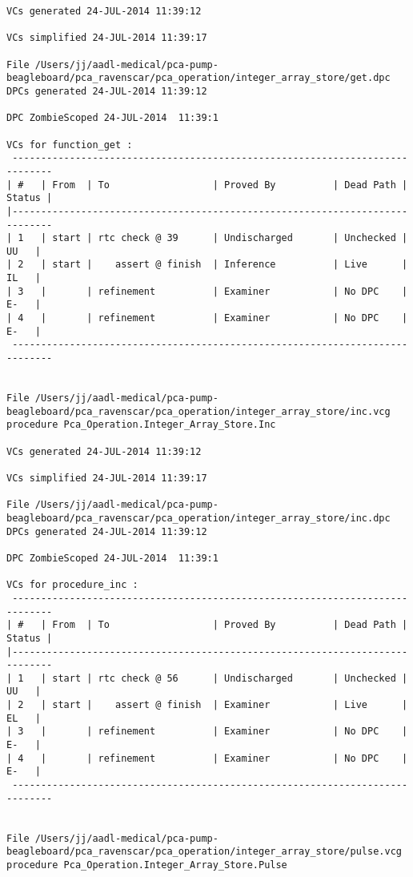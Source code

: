 \begin{lstlisting}[frame=single, gobble=0, caption={POGS report for PCA Pump prototype}]
VCs generated 24-JUL-2014 11:39:12

VCs simplified 24-JUL-2014 11:39:17

File /Users/jj/aadl-medical/pca-pump-beagleboard/pca_ravenscar/pca_operation/integer_array_store/get.dpc
DPCs generated 24-JUL-2014 11:39:12

DPC ZombieScoped 24-JUL-2014  11:39:1

VCs for function_get :
 -----------------------------------------------------------------------------
| #   | From  | To                  | Proved By          | Dead Path | Status |
|-----------------------------------------------------------------------------
| 1   | start | rtc check @ 39      | Undischarged       | Unchecked |   UU   |
| 2   | start |    assert @ finish  | Inference          | Live      |   IL   |
| 3   |       | refinement          | Examiner           | No DPC    |   E-   |
| 4   |       | refinement          | Examiner           | No DPC    |   E-   |
 -----------------------------------------------------------------------------


File /Users/jj/aadl-medical/pca-pump-beagleboard/pca_ravenscar/pca_operation/integer_array_store/inc.vcg
procedure Pca_Operation.Integer_Array_Store.Inc

VCs generated 24-JUL-2014 11:39:12

VCs simplified 24-JUL-2014 11:39:17

File /Users/jj/aadl-medical/pca-pump-beagleboard/pca_ravenscar/pca_operation/integer_array_store/inc.dpc
DPCs generated 24-JUL-2014 11:39:12

DPC ZombieScoped 24-JUL-2014  11:39:1

VCs for procedure_inc :
 -----------------------------------------------------------------------------
| #   | From  | To                  | Proved By          | Dead Path | Status |
|-----------------------------------------------------------------------------
| 1   | start | rtc check @ 56      | Undischarged       | Unchecked |   UU   |
| 2   | start |    assert @ finish  | Examiner           | Live      |   EL   |
| 3   |       | refinement          | Examiner           | No DPC    |   E-   |
| 4   |       | refinement          | Examiner           | No DPC    |   E-   |
 -----------------------------------------------------------------------------


File /Users/jj/aadl-medical/pca-pump-beagleboard/pca_ravenscar/pca_operation/integer_array_store/pulse.vcg
procedure Pca_Operation.Integer_Array_Store.Pulse


\end{lstlisting}
